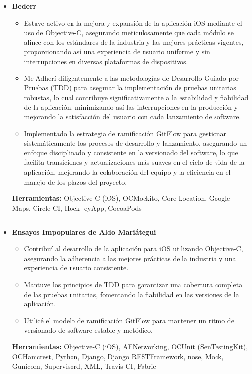 \documentclass[11pt,a4paper,english]{moderncv}
\begin{document}
{
\begin{itemize}
    \item \textbf{Bederr}
        \begin{itemize}
            \item Estuve activo en la mejora y expansión de la aplicación iOS mediante el uso de Objective-C, asegurando meticulosamente que cada módulo se alinee con los estándares de la industria y las mejores prácticas vigentes, proporcionando así una experiencia de usuario uniforme y sin interrupciones en diversas plataformas de dispositivos.
            \item Me Adherí diligentemente a las metodologías de Desarrollo Guiado por Pruebas (TDD) para asegurar la implementación de pruebas unitarias robustas, lo cual contribuye significativamente a la estabilidad y fiabilidad de la aplicación, minimizando así las interrupciones en la producción y mejorando la satisfacción del usuario con cada lanzamiento de software.
            \item Implementado la estrategia de ramificación GitFlow para gestionar sistemáticamente los procesos de desarrollo y lanzamiento, asegurando un enfoque disciplinado y consistente en la versionado del software, lo que facilita transiciones y actualizaciones más suaves en el ciclo de vida de la aplicación, mejorando la colaboración del equipo y la eficiencia en el manejo de los plazos del proyecto.
        \end{itemize}
        \textbf{Herramientas:} Objective-C (iOS), OCMockito, Core Location, Google Maps, Circle CI, Hock- eyApp, CocoaPods
\end{itemize}
}

\subsection{}

{
\begin{itemize}
    \item \textbf{Ensayos Impopulares de Aldo Mariátegui}
        \begin{itemize}
            \item Contribuí al desarrollo de la aplicación para iOS utilizando Objective-C, asegurando la adherencia a las mejores prácticas de la industria y una experiencia de usuario consistente.
            \item Mantuve los principios de TDD para garantizar una cobertura completa de las pruebas unitarias, fomentando la fiabilidad en las versiones de la aplicación.
            \item Utilicé el modelo de ramificación GitFlow para mantener un ritmo de versionado de software estable y metódico.
        \end{itemize}
        \textbf{Herramientas:} Objective-C (iOS), AFNetworking, OCUnit (SenTestingKit), OCHamcrest, Python, Django, Django RESTFramework, nose, Mock, Gunicorn, Supervisord, XML, Travis-CI, Fabric
\end{itemize}
}
\end{document}
